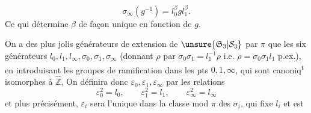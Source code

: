 \[
\sigma_\infty(g^{-1})=l_0^\beta g l_1^\beta.
\]
Ce qui détermine $\beta$ de façon unique en fonction de $g$.


On a des plus jolis générateurs de  extension de $\unsure{\mathfrak S_3|\mathcal S_3}$ par $\pi$  que les six générateurs $l_0,l_1,l_\infty,\sigma_0,\sigma_1,\sigma_\infty$ (donnant $\rho$ par $\sigma_0\sigma_1=l_1^{-1}\rho$  i.e. $\rho=\sigma_0\sigma_1l_1$ p.ex.), en introduisant les groupes de ramification dans les pts $0,1,\infty$, qui sont canoniq\textsuperscript{t} isomorphes à $\widehat{\mathbb Z}$,
On définira donc $\varepsilon_0,\varepsilon_1,\varepsilon_\infty$ par les relations
\[
\varepsilon_0^2=l_0,\qquad\varepsilon_1^2=l_1,\qquad\varepsilon_\infty^2=l_\infty
\]
et plus précisément, $\varepsilon_i$ sera l'unique   dans la classe mod $\pi$ des $\sigma_i$,  qui fixe $l_i$ et est  
